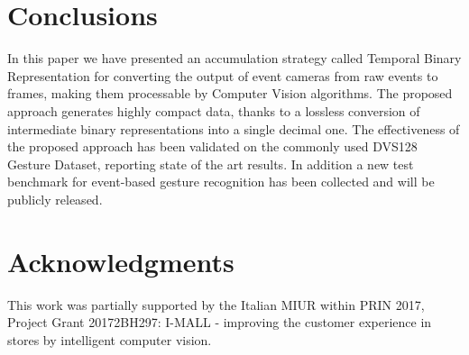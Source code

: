\documentclass[a4paper,conference]{IEEEtran}
\begin{document}
\section{Conclusions}
\label{sec:conclusions}
In this paper we have presented an accumulation strategy called Temporal Binary Representation for converting the output of event cameras from raw events to frames, making them processable by Computer Vision algorithms. The proposed approach generates highly compact data, thanks to a lossless conversion of intermediate binary representations into a single decimal one. The effectiveness of the proposed approach has been validated on the commonly used DVS128 Gesture Dataset, reporting state of the art results. In addition a new test benchmark for event-based gesture recognition has been collected and will be publicly released.

\section*{Acknowledgments}
This work was partially supported by the Italian MIUR within PRIN 2017, Project Grant 20172BH297: I-MALL - improving the customer experience in stores by intelligent computer vision.










\end{document}
